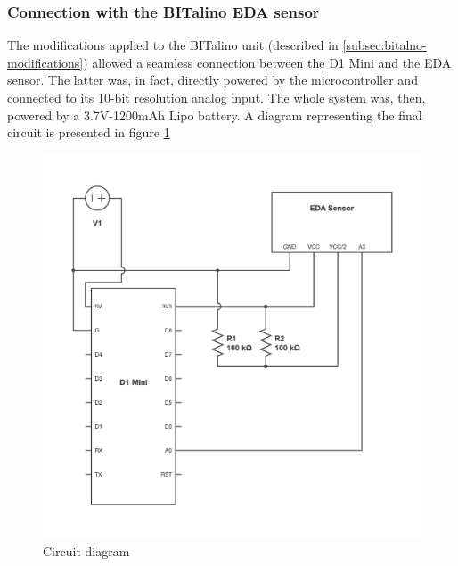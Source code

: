 \subsubsection{Connection with the BITalino EDA sensor}\label{subsubsec:d1mini}

The modifications applied to the BITalino unit (described in \ref{subsec:bitalno-modifications}) allowed a seamless connection between the D1 Mini and the EDA sensor. The latter was, in fact, directly powered by the microcontroller and connected to its 10-bit resolution analog input. The whole system was, then, powered by a 3.7V-1200mAh Lipo battery. A diagram representing the final circuit is presented in figure \ref{fig:circuit-diagram}

\begin{figure}[h]
    \centering
    \includegraphics[width=\textwidth]{./images/circuit-diagram.png}
    \caption{Circuit diagram}
    \label{fig:circuit-diagram}
\end{figure}


